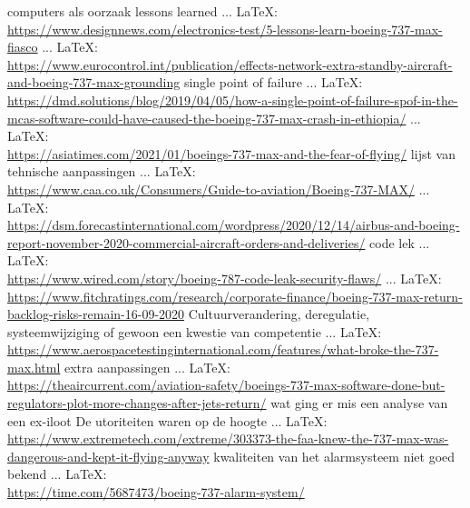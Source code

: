 \begin{thebibliography}{99}
computers als oorzaak
lessons learned
 ... \LaTeX:\\ \url{https://www.designnews.com/electronics-test/5-lessons-learn-boeing-737-max-fiasco}
 ... \LaTeX:\\ \url{https://www.eurocontrol.int/publication/effects-network-extra-standby-aircraft-and-boeing-737-max-grounding}
single point of failure
 ... \LaTeX:\\ \url{https://dmd.solutions/blog/2019/04/05/how-a-single-point-of-failure-spof-in-the-mcas-software-could-have-caused-the-boeing-737-max-crash-in-ethiopia/}
 ... \LaTeX:\\ \url{https://asiatimes.com/2021/01/boeings-737-max-and-the-fear-of-flying/}
lijst van tehnische aanpassingen
 ... \LaTeX:\\ \url{https://www.caa.co.uk/Consumers/Guide-to-aviation/Boeing-737-MAX/}
 ... \LaTeX:\\ \url{https://dsm.forecastinternational.com/wordpress/2020/12/14/airbus-and-boeing-report-november-2020-commercial-aircraft-orders-and-deliveries/}
code lek
 ... \LaTeX:\\ \url{https://www.wired.com/story/boeing-787-code-leak-security-flaws/}
 ... \LaTeX:\\ \url{https://www.fitchratings.com/research/corporate-finance/boeing-737-max-return-backlog-risks-remain-16-09-2020}
Cultuurverandering, deregulatie, systeemwijziging of gewoon een kwestie van competentie
 ... \LaTeX:\\ \url{https://www.aerospacetestinginternational.com/features/what-broke-the-737-max.html}
extra aanpassingen
 ... \LaTeX:\\ \url{https://theaircurrent.com/aviation-safety/boeings-737-max-software-done-but-regulators-plot-more-changes-after-jets-return/}
wat ging er mis een analyse van een ex-iloot
De utoriteiten waren op de hoogte
 ... \LaTeX:\\ \url{https://www.extremetech.com/extreme/303373-the-faa-knew-the-737-max-was-dangerous-and-kept-it-flying-anyway}
kwaliteiten van het alarmsysteem niet goed bekend
 ... \LaTeX:\\ \url{https://time.com/5687473/boeing-737-alarm-system/}

\end{thebibliography}
